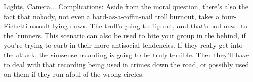 \begin{scenario}{Lights, Camera...}
Complications: Aside from the moral question, there's also the fact that nobody, not even a hard-as-a-coffin-nail troll burnout, takes a four-Fichetti assault lying down. The troll's going to flip out, and that's bad news to the 'runners. This scenario can also be used to bite your group in the behind, if you're trying to curb in their more antisocial tendencies. If they really get into the attack, the simsense recording is going to be truly terrible. Then they'll have to deal with that recording being used in crimes down the road, or possibly used on them if they run afoul of the wrong circles. 

\end{scenario}